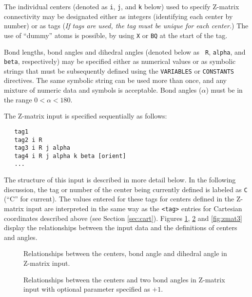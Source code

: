 
The individual centers (denoted as \verb+i+, \verb+j+, and \verb+k+
below) used to specify Z-matrix connectivity may be designated either
as integers (identifying each center by number) or as tags ({\em If
  tags are used, the tag must be unique for each center.}) The use of
``dummy'' atoms is possible, by using \verb+X+ or \verb+BQ+ at the
start of the tag.

Bond lengths, bond angles and dihedral angles (denoted below as {\tt
  R}, {\tt alpha}, and {\tt beta}, respectively) may be specified
either as numerical values or as symbolic strings that must be
subsequently defined using the \verb+VARIABLES+ or \verb+CONSTANTS+
directives.  The same symbolic string can be used more than once, and
any mixture of numeric data and symbols is acceptable. Bond angles
($\alpha$) must be in the range $0 < \alpha < 180$.

The Z-matrix input is specified sequentially as follows:
\begin{verbatim}
   tag1
   tag2 i R
   tag3 i R j alpha
   tag4 i R j alpha k beta [orient]
   ...
\end{verbatim}

The structure of this input is described in more detail below.  In the
following discussion, the tag or number of the center being currently
defined is labeled as \verb+C+ (``C'' for current).  The values
entered for these tags for centers defined in the Z-matrix input are
interpreted in the same way as the \verb+<tag>+ entries for Cartesian
coordinates described above (see Section \ref{sec:cart}).  Figures
\ref{fig:zmat1}, \ref{fig:zmat2} and \ref{fig:zmat3} display the
relationships between the input data and the definitions of centers
and angles.

\begin{figure}[htbp]
\centering
{}

\caption{\label{fig:zmat1} Relationships between the centers, bond angle
and dihedral angle in Z-matrix input.}
\end{figure}

\begin{figure}[htbp]
\centering
{}

\caption{\label{fig:zmat2} Relationships between the centers and two
  bond angles in Z-matrix input with optional parameter specified as $+1$.}
\end{figure}

